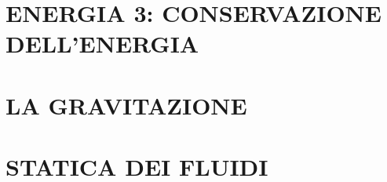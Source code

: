 \documentclass{article}
\begin{document}
	\section{ENERGIA 3: CONSERVAZIONE DELL'ENERGIA}
		\begin{multicols}{2}
\begin{comment}
			\begin{equation}  \end{equation}
			\begin{equation}  \end{equation}
			\begin{equation}  \end{equation}
			\begin{equation}  \end{equation}
\end{comment}
		\end{multicols}
	\section{LA GRAVITAZIONE}
		\begin{multicols}{2}
\begin{comment}
			\begin{equation}  \end{equation}
			\begin{equation}  \end{equation}
			\begin{equation}  \end{equation}
			\begin{equation}  \end{equation}
\end{comment}
		\end{multicols}
	\section{STATICA DEI FLUIDI}
		\begin{multicols}{2}
\begin{comment}
			\begin{equation}  \end{equation}
			\begin{equation}  \end{equation}
			\begin{equation}  \end{equation}
			\begin{equation}  \end{equation}
\end{comment}
		\end{multicols}
\end{document}
